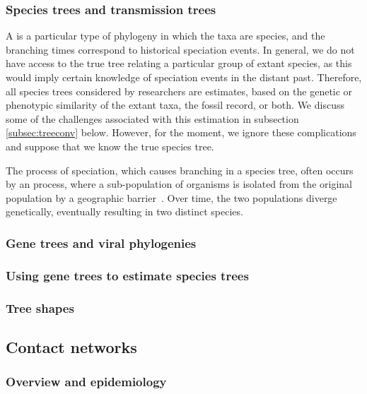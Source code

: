 \subsubsection{Species trees and transmission trees}

A  is a particular type of phylogeny in which the taxa are
species, and the branching times correspond to historical speciation events. In
general, we do not have access to the true tree relating a particular group of
extant species, as this would imply certain knowledge of speciation events in
the distant past. Therefore, all species trees considered by researchers are
estimates, based on the genetic or phenotypic similarity of the extant taxa,
the fossil record, or both. We discuss some of the challenges associated with
this estimation in subsection \ref{subsec:treeconv} below. However, for the
moment, we ignore these complications and suppose that we know the true species
tree.

The process of speciation, which causes branching in a species tree, often
occurs by an  process, where a sub-population of organisms is
isolated from the original population by a geographic
barrier~\autocite{coyne2004speciation}. Over time, the two populations diverge
genetically, eventually resulting in two distinct species.

\subsubsection{Gene trees and viral phylogenies}

\subsubsection{Using gene trees to estimate species trees}

\subsubsection{Tree shapes}

\subsection{Contact networks}

\subsubsection{Overview and epidemiology}

